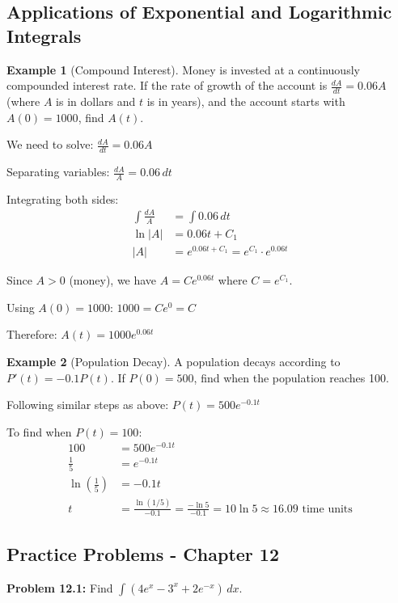 \documentclass[12pt,a4paper]{book}
\theoremstyle{definition}
\newtheorem{example}{Example}[chapter]
\begin{document}
\subsection{Applications of Exponential and Logarithmic Integrals}

\begin{example}[Compound Interest]
Money is invested at a continuously compounded interest rate. If the rate of growth of the account is $\frac{dA}{dt} = 0.06A$ (where $A$ is in dollars and $t$ is in years), and the account starts with $A(0) = 1000$, find $A(t)$.

We need to solve: $\frac{dA}{dt} = 0.06A$

Separating variables: $\frac{dA}{A} = 0.06 \, dt$

Integrating both sides:
\begin{align}
\int \frac{dA}{A} &= \int 0.06 \, dt\\
\ln|A| &= 0.06t + C_1\\
|A| &= e^{0.06t + C_1} = e^{C_1} \cdot e^{0.06t}
\end{align}

Since $A > 0$ (money), we have $A = Ce^{0.06t}$ where $C = e^{C_1}$.

Using $A(0) = 1000$:
$1000 = Ce^{0} = C$

Therefore: $A(t) = 1000e^{0.06t}$
\end{example}

\begin{example}[Population Decay]
A population decays according to $P'(t) = -0.1P(t)$. If $P(0) = 500$, find when the population reaches 100.

Following similar steps as above:
$P(t) = 500e^{-0.1t}$

To find when $P(t) = 100$:
\begin{align}
100 &= 500e^{-0.1t}\\
\frac{1}{5} &= e^{-0.1t}\\
\ln\left(\frac{1}{5}\right) &= -0.1t\\
t &= \frac{\ln(1/5)}{-0.1} = \frac{-\ln 5}{-0.1} = 10\ln 5 \approx 16.09 \text{ time units}
\end{align}
\end{example}

\subsection{Practice Problems - Chapter 12}

\textbf{Problem 12.1:} Find $\int (4e^x - 3^x + 2e^{-x}) \, dx$.
\end{document}
